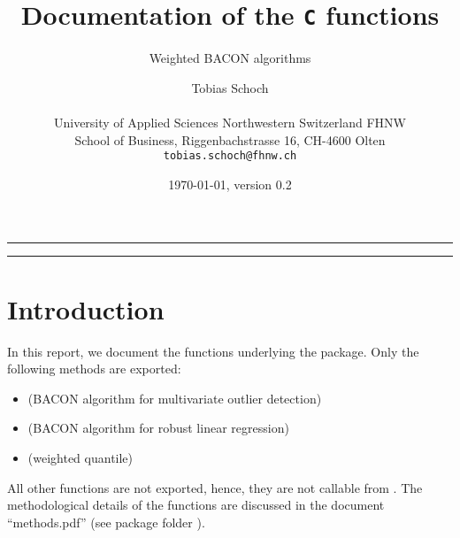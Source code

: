 \documentclass[a4paper,oneside,10pt,DIV=12]{scrartcl}
\begin{document}
\title{\Large Documentation of the \texttt{C} functions}
\subtitle{Weighted BACON algorithms}

\author{{\normalsize Tobias Schoch} \\
\begin{minipage}[t][][t]{\textwidth}
	\begin{center}
	\small{University of Applied Sciences Northwestern Switzerland FHNW} \\
	\small{School of Business, Riggenbachstrasse 16, CH-4600 Olten} \\
	\small{\texttt{tobias.schoch{@}fhnw.ch}}
	\end{center}
\end{minipage}}

\date{{\small \today, version 0.2}}
\maketitle

\vspace{1em}
\hrule
\vspace{-0.5em}
\setcounter{tocdepth}{1}
\tableofcontents
\vspace{0.5em}
\hrule
\vspace{1em}

\section{Introduction}
In this report, we document the  functions underlying the 
 package. Only the following methods are exported:
\begin{itemize}
	\item {} (BACON algorithm for multivariate
		outlier detection)
	\item {} (BACON algorithm for robust
		linear regression)
	\item {} (weighted quantile)
\end{itemize}

\noindent All other functions are not exported, hence, they are not callable
from . The methodological details of the functions are discussed in the
document ``methods.pdf'' (see package folder ).
\end{document}

